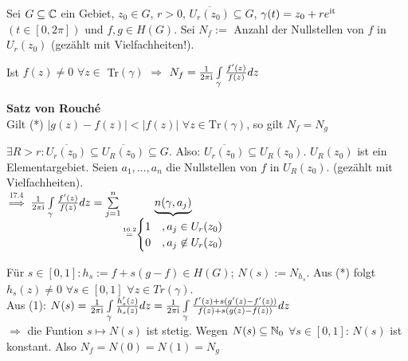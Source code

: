 \documentclass[a4paper,twoside,DIV15,BCOR12mm]{scrbook}
\def\wegint{\ensuremath{\int\limits_\gamma}}
\def\ie{\rm i}
\begin{document}
\begin{folgerungen}
  Sei $G \subseteq \mathbb{C}$ ein Gebiet, $z_0 \in G$, $r > 0$, $\overline{U_r(z_0)}
  \subseteq G$, $\gamma(t) = z_0 + r e^{\ie t}$ $(t \in [0, 2 \pi])$ und $f,g \in
  H(G)$. Sei $N_f := $ Anzahl der Nullstellen von $f$ in $U_r(z_0)$ (gez\"ahlt mit
  Vielfachheiten!).  
  \begin{liste}
    \item Ist $f(z) \neq 0$ $\forall z \in$ Tr$(\gamma)$ $\Rightarrow$
     $N_f = \frac{1}{2 \pi \ie} \wegint \frac{f'(z)}{f(z)} dz $ 
    \item \textbf{Satz von Rouch\'{e}} \\
     Gilt (*) $|g(z)- f(z)| < |f(z)|$ $\forall z \in \text{Tr}(\gamma)$, so gilt 
     $N_f = N_g$
  \end{liste} 
\end{folgerungen}
\begin{beweis}
  \begin{liste}
    \item $\exists R > r: \overline{U_r(z_0)} \subseteq \overline{U_R(z_0)}
    \subseteq G$. Also: $\overline{U_r(z_0)} \subseteq U_R(z_0)$. $U_R(z_0)$ ist ein
    Elementargebiet. Seien $a_1, \ldots, a_n$ die Nullstellen von $f$ in $U_R(z_0)$.
    (gez\"ahlt mit Vielfachheiten).\\
    $\stackrel{\text{17.4}}{\Rightarrow}$ $\frac{1}{2 \pi \ie} \wegint
    \frac{f'(z)}{f(z)} dz = \sum\limits_{j=1}^n \underbrace{n(\gamma, a_j)}_{
    \stackrel{\text{16.2}}{=}
    \begin{cases} 
    	1 & , a_j \in U_r(z_0) \\ 
	0 & ,a_j \not\in U_r(z_0)
    \end{cases}
    }$
    \item F\"ur $s \in [0,1]: h_s := f + s(g-f) \in H(G)$; $N(s) := N_{h_s}$. Aus (*)
    folgt $h_s(z) \neq 0$ $ \forall s \in [0,1]$ $\forall z \in Tr(\gamma)$. \\
    Aus (1): $N(s)= \frac{1}{2 \pi \ie} \wegint \frac{h_s'(z)}{h_s(z)} dz =  
    \frac{1}{2 \pi \ie} \wegint \frac{f'(z)+s(g'(z)-f'(z))}{f(z) + s(g(z)-f(z))} dz$
    \\ $\Rightarrow$ die Funtion $s \mapsto N(s)$ ist stetig. Wegen $N(s) \subseteq
    \mathbb{N}_0$ $\forall s \in [0,1]$: $N(s)$ ist konstant. Also $N_f = N(0) = N(1) = N_g$
  \end{liste}
\end{beweis}
\end{document}
